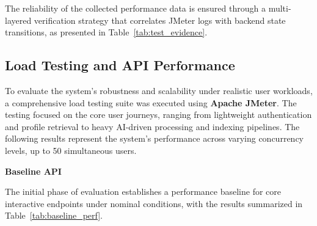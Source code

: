 The reliability of the collected performance data is ensured through a multi-layered verification strategy that correlates JMeter logs with backend state transitions, as presented in Table~\ref{tab:test_evidence}.

\begin{table}[H]
    \centering
    \caption{Test Evidence and Verification Methods.}
    \label{tab:test_evidence}
\end{table}

\subsection{Load Testing and API Performance}

To evaluate the system's robustness and scalability under realistic user workloads, a comprehensive load testing suite was executed using \textbf{Apache JMeter}. The testing focused on the core user journeys, ranging from lightweight authentication and profile retrieval to heavy AI-driven processing and indexing pipelines. The following results represent the system's performance across varying concurrency levels, up to 50 simultaneous users.

\textbf{Baseline API}

The initial phase of evaluation establishes a performance baseline for core interactive endpoints under nominal conditions, with the results summarized in Table~\ref{tab:baseline_perf}.

\begin{table}[H]
    \centering
    \caption{Baseline API Performance Matrix.}
    \label{tab:baseline_perf}
\end{table}

